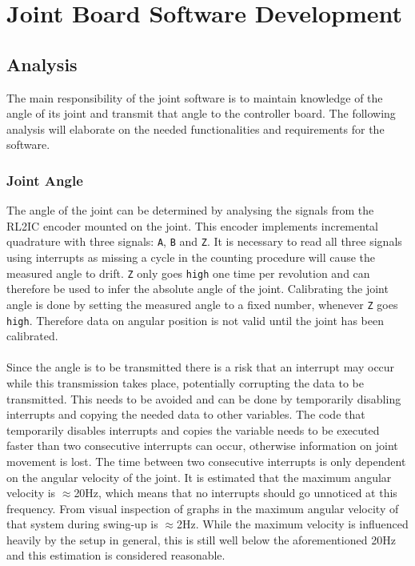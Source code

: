 \section{Joint Board Software Development} %
\label{sub:joint_board_software}

\subsection{Analysis} %
\label{ssub:joint_board_analysis}
The main responsibility of the joint software is to maintain knowledge of the angle of its joint and transmit that angle to the controller board.
The following analysis will elaborate on the needed functionalities and requirements for the software.

\subsubsection{Joint Angle}
The angle of the joint can be determined by analysing the signals from the RL2IC encoder mounted on the joint.
This encoder implements incremental quadrature with three signals: \texttt{A}, \texttt{B} and \texttt{Z}.
It is necessary to read all three signals using interrupts as missing a cycle in the counting procedure will cause the measured angle to drift.
\texttt{Z} only goes \texttt{high} one time per revolution and can therefore be used to infer the absolute angle of the joint.
Calibrating the joint angle is done by setting the measured angle to a fixed number, whenever \texttt{Z} goes \texttt{high}.
Therefore data on angular position is not valid until the joint has been calibrated.
\\~\\
Since the angle is to be transmitted there is a risk that an interrupt may occur while this transmission takes place, potentially corrupting the data to be transmitted.
This needs to be avoided and can be done by temporarily disabling interrupts and copying the needed data to other variables.
The code that temporarily disables interrupts and copies the variable needs to be executed faster than two consecutive interrupts can occur, otherwise information on joint movement is lost.
The time between two consecutive interrupts is only dependent on the angular velocity of the joint.
It is estimated that the maximum angular velocity is  $\approx$20Hz, which means that no interrupts should go unnoticed at this frequency.
From visual inspection of graphs in \cite{doubleinvertpendulum} the maximum angular velocity of that system during swing-up is $\approx$2Hz. 
While the maximum velocity is influenced heavily by the setup in general, this is still well below the aforementioned 20Hz and this estimation is considered reasonable.

